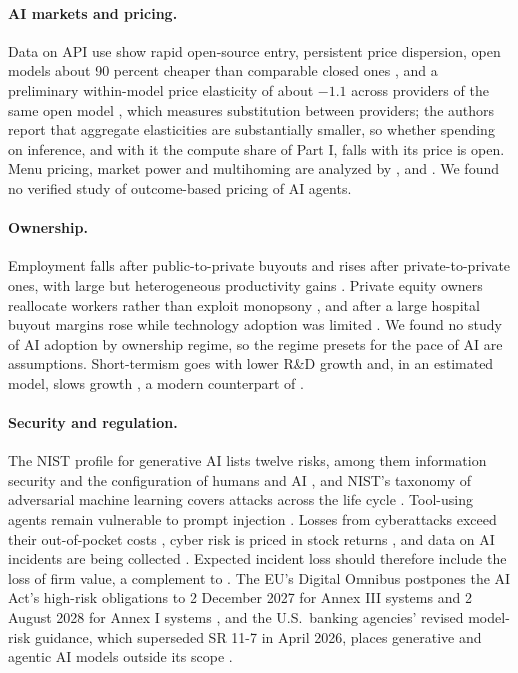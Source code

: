 \paragraph{AI markets and pricing.} Data on API use show rapid open-source entry, persistent price dispersion, open models about 90 percent cheaper than comparable closed ones \citep{demirer2026emerging,demirer2025emerging}, and a preliminary within-model price elasticity of about $-1.1$ across providers of the same open model \citep{demirer2025emerging}, which measures substitution between providers; the authors report that aggregate elasticities are substantially smaller, so whether spending on inference, and with it the compute share of Part I, falls with its price is open. Menu pricing, market power and multihoming are analyzed by \citet{bergemann2025menu}, \citet{gans2024market} and \citet{fradkin2025demand}. We found no verified study of outcome-based pricing of AI agents.

\paragraph{Ownership.} Employment falls after public-to-private buyouts and rises after private-to-private ones, with large but heterogeneous productivity gains \citep{davis2019heterogenous}. Private equity owners reallocate workers rather than exploit monopsony \citep{herkenhoff2025private}, and after a large hospital buyout margins rose while technology adoption was limited \citep{richards2024managing}. We found no study of AI adoption by ownership regime, so the regime presets for the pace of AI are assumptions. Short-termism goes with lower R\&D growth and, in an estimated model, slows growth \citep{terry2023macro}, a modern counterpart of \citet{stein1989efficient}.

\paragraph{Security and regulation.} The NIST profile for generative AI lists twelve risks, among them information security and the configuration of humans and AI \citep{nist2024artificial}, and NIST's taxonomy of adversarial machine learning covers attacks across the life cycle \citep{vassilev2025adversarial}. Tool-using agents remain vulnerable to prompt injection \citep{greshake2023not,debenedetti2024agentdojo}. Losses from cyberattacks exceed their out-of-pocket costs \citep{kamiya2021risk}, cyber risk is priced in stock returns \citep{florackis2023cybersecurity}, and data on AI incidents are being collected \citep{mcgregor2021preventing}. Expected incident loss should therefore include the loss of firm value, a complement to \citet{gordon2002economics}. The EU's Digital Omnibus postpones the AI Act's high-risk obligations to 2 December 2027 for Annex III systems and 2 August 2028 for Annex I systems \citep{eu2026regulation,eu2024regulation}, and the U.S.\ banking agencies' revised model-risk guidance, which superseded SR 11-7 in April 2026, places generative and agentic AI models outside its scope \citep{fed2026sr262,occ2026bulletin13}.

